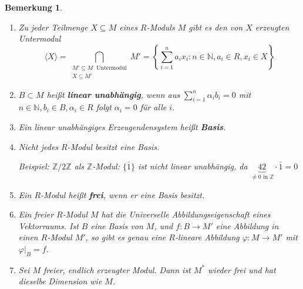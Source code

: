 \documentclass[a4paper,12pt]{scrbook}
\theoremstyle{break}
\newtheorem{Bem}[Def]{Bemerkung}
\theoremstyle{nonumberbreak}
\theoremstyle{nonumberplain}
\newcommand{\emp}[1]{\textbf{\emph{#1}}}
\begin{document}
\begin{Bem}
  \begin{enumerate}
    \item Zu jeder Teilmenge $X \subseteq M$ eines $R$-Moduls $M$ gibt es den von
          $X$ erzeugten Untermodul $$\langle X \rangle = \displaystyle 
          \bigcap_{\substack{M' \subseteq M\; \text{ Untermodul} \\ X \subseteq M'}} M' = \left\{
          \sum_{i=1}^n a_i x_i: n \in \mathbb{N}, a_i \in R, x_i \in X \right\}$$
    \item $B \subset M$ heißt \emp{linear unabhängig},
          wenn aus $\displaystyle \sum_{i=1}^n \alpha_i b_i = 0$ mit $n \in
          \mathbb{N}, b_i \in B, \alpha_i \in R$ folgt $\alpha_i = 0$ für alle
          $i$.
    \item Ein linear unabhängiges Erzeugendensystem heißt
          \emp{Basis}.
    \item Nicht jedes $R$-Modul besitzt eine Basis.

          Beispiel: $\mathbb{Z}/2\mathbb{Z}$ als $\mathbb{Z}$-Modul: $\{\bar{1}\}$
          ist nicht linear unabhängig, da $\underbrace{42}_{\not= 0 \text{ in } \mathbb{Z}} \cdot \bar{1} = 0$
    \item Ein $R$-Modul heißt \emp{frei}, wenn er eine
          Basis besitzt.
    \item Ein freier $R$-Modul $M$ hat die Universelle Abbildungseigenschaft eines Vektorraums. Ist $B$ eine
          Basis von $M$, und $f: B \to M'$ eine Abbildung in einen $R$-Modul $M'$, so
          gibt es genau eine $R$-lineare Abbildung $\varphi: M \to M'$ mit
          $\varphi|_B = f$.
    \item Sei $M$ freier, endlich erzeugter Modul. Dann ist $M^*$ wieder frei und hat dieselbe
          Dimension wie $M$.
  \end{enumerate}
\end{Bem}
\end{document}
